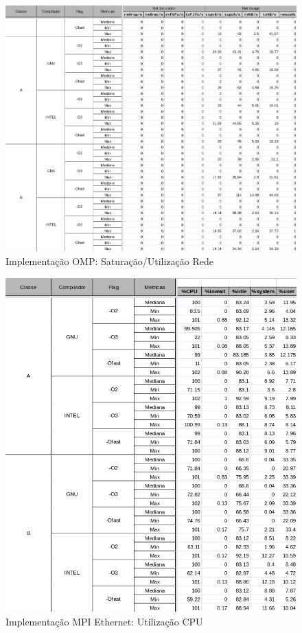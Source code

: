 \documentclass{article}
\begin{document}
\begin{appendices}
\begin{figure}[H]
    \centering
    \includegraphics[width=12cm]{Pictures/FT_r431_OMP_NET.png}
    \caption{Implementação OMP: Saturação/Utilização Rede}
    \label{figure:FT_r431_OMP_NET}
\end{figure}



\begin{figure}[H]
    \centering
    \includegraphics[width=12cm]{Pictures/FT_r431_MPIE_CPU.png}
    \caption{Implementação MPI Ethernet: Utilização CPU}
    \label{figure:FT_r431_MPIE_CPU}
\end{figure}


\end{appendices}
\end{document}
